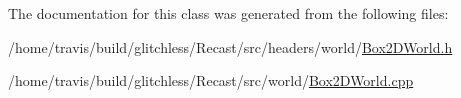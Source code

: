 The documentation for this class was generated from the following files\-:\begin{DoxyCompactItemize}
\item 
/home/travis/build/glitchless/\-Recast/src/headers/world/\hyperlink{_box2_d_world_8h}{Box2\-D\-World.\-h}\item 
/home/travis/build/glitchless/\-Recast/src/world/\hyperlink{_box2_d_world_8cpp}{Box2\-D\-World.\-cpp}\end{DoxyCompactItemize}
